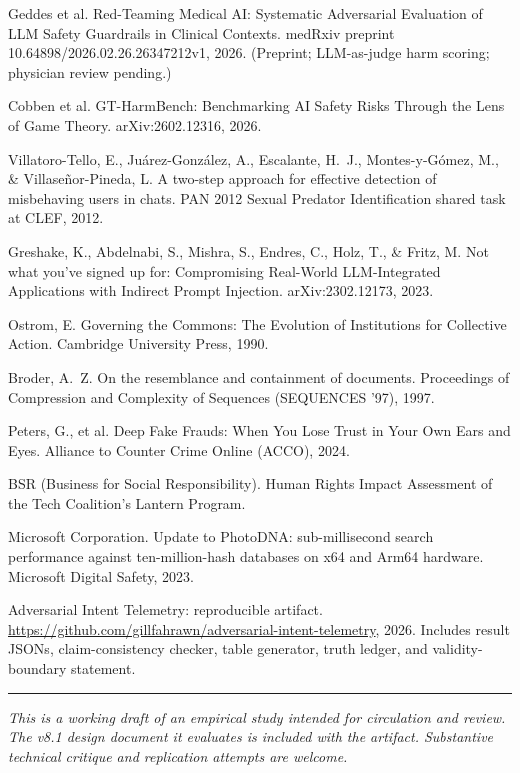 \documentclass[11pt]{article}
\begin{document}
\begin{enumerate}[label={[\arabic*]}, leftmargin=2.4em, itemsep=2pt]
\item[{[10]}] Geddes et al. Red-Teaming Medical AI: Systematic Adversarial Evaluation of LLM Safety Guardrails in Clinical Contexts. medRxiv preprint 10.64898/2026.02.26.26347212v1, 2026. (Preprint; LLM-as-judge harm scoring; physician review pending.)
\item[{[11]}] Cobben et al. GT-HarmBench: Benchmarking AI Safety Risks Through the Lens of Game Theory. arXiv:2602.12316, 2026.
\item[{[12]}] Villatoro-Tello, E., Ju\'arez-Gonz\'alez, A., Escalante, H.~J., Montes-y-G\'omez, M., \& Villase\~nor-Pineda, L. A two-step approach for effective detection of misbehaving users in chats. PAN 2012 Sexual Predator Identification shared task at CLEF, 2012.
\item[{[13]}] Greshake, K., Abdelnabi, S., Mishra, S., Endres, C., Holz, T., \& Fritz, M. Not what you've signed up for: Compromising Real-World LLM-Integrated Applications with Indirect Prompt Injection. arXiv:2302.12173, 2023.
\item[{[14]}] Ostrom, E. Governing the Commons: The Evolution of Institutions for Collective Action. Cambridge University Press, 1990.
\item[{[15]}] Broder, A.~Z. On the resemblance and containment of documents. Proceedings of Compression and Complexity of Sequences (SEQUENCES '97), 1997.
\item[{[16]}] Peters, G., et al. Deep Fake Frauds: When You Lose Trust in Your Own Ears and Eyes. Alliance to Counter Crime Online (ACCO), 2024.
\item[{[17]}] BSR (Business for Social Responsibility). Human Rights Impact Assessment of the Tech Coalition's Lantern Program.
\item[{[18]}] Microsoft Corporation. Update to PhotoDNA: sub-millisecond search performance against ten-million-hash databases on x64 and Arm64 hardware. Microsoft Digital Safety, 2023.
\item[{[19]}] Adversarial Intent Telemetry: reproducible artifact. \url{https://github.com/gillfahrawn/adversarial-intent-telemetry}, 2026. Includes result JSONs, claim-consistency checker, table generator, truth ledger, and validity-boundary statement.
\end{enumerate}

\vspace{1em}
\hrule
\vspace{0.5em}
\noindent\small\emph{This is a working draft of an empirical study intended for circulation and review. The v8.1 design document it evaluates is included with the artifact. Substantive technical critique and replication attempts are welcome.}
\end{document}
